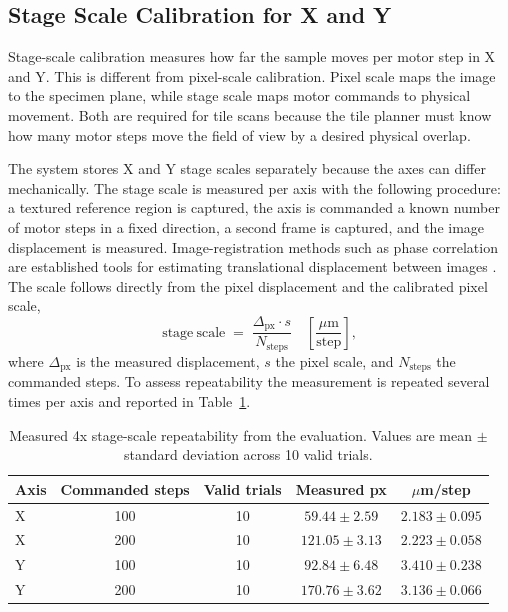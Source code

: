 \subsection{Stage Scale Calibration for X and Y}

Stage-scale calibration measures how far the sample moves per motor step in X and Y. This is different from pixel-scale calibration. Pixel scale maps the image to the specimen plane, while stage scale maps motor commands to physical movement. Both are required for tile scans because the tile planner must know how many motor steps move the field of view by a desired physical overlap.

The system stores X and Y stage scales separately because the axes can differ mechanically. The stage scale is measured per axis with the following procedure: a textured reference region is captured, the axis is commanded a known number of motor steps in a fixed direction, a second frame is captured, and the image displacement is measured. Image-registration methods such as phase correlation are established tools for estimating translational displacement between images \cite{guizar2008subpixel}. The scale follows directly from the pixel displacement and the calibrated pixel scale,
\[
    \mathrm{stage\ scale} \;=\; \frac{\Delta_{\mathrm{px}}\cdot s}{N_{\mathrm{steps}}}
    \quad\left[\frac{\mu\mathrm{m}}{\mathrm{step}}\right],
\]
where $\Delta_{\mathrm{px}}$ is the measured displacement, $s$ the pixel scale, and $N_{\mathrm{steps}}$ the commanded steps. To assess repeatability the measurement is repeated several times per axis and reported in Table~\ref{tab:stagescale-protocol}.

\begin{table}[H]
    \centering
    \caption[Measured 4x stage-scale repeatability]{Measured 4x stage-scale repeatability from the evaluation. Values are mean
    $\pm$ standard deviation across 10 valid trials.}
    \label{tab:stagescale-protocol}
    \begin{tabular}{@{}l c c c c@{}}
        \toprule
        \textbf{Axis} & \textbf{Commanded steps} & \textbf{Valid trials} &
        \textbf{Measured px} & \textbf{$\mu$m/step} \\
        \midrule
        X & 100 & 10 & $59.44 \pm 2.59$ & $2.183 \pm 0.095$ \\
        X & 200 & 10 & $121.05 \pm 3.13$ & $2.223 \pm 0.058$ \\
        Y & 100 & 10 & $92.84 \pm 6.48$ & $3.410 \pm 0.238$ \\
        Y & 200 & 10 & $170.76 \pm 3.62$ & $3.136 \pm 0.066$ \\
        \bottomrule
    \end{tabular}
\end{table}

